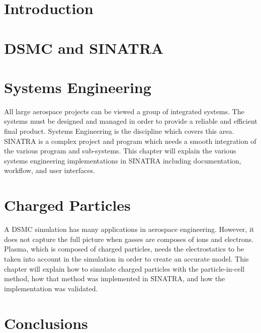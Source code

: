 \chapter{Introduction}
\label{chap:intro}


\chapter{DSMC and SINATRA}
\label{chap:dsmc}



\chapter{Systems Engineering}
\label{chap:systems}
All large aerospace projects can be viewed a group of integrated systems. The systems must be designed and managed in order to provide a reliable and efficient final product. Systems Engineering is the discipline which covers this area. SINATRA is a complex project and program which needs a smooth integration of the various program and sub-systems. This chapter will explain the various systems engineering implementations in SINATRA including documentation, workflow, and user interfaces. 




\chapter{Charged Particles}
A DSMC simulation has many applications in aerospace engineering. However, it does not capture the full picture when gasses are composes of ions and electrons. Plasma, which is composed of charged particles, needs the electrostatics to be taken into account in the simulation in order to create an accurate model. This chapter will explain how to simulate charged particles with the particle-in-cell method, how that method was implemented in SINATRA, and how the implementation was validated.
\label{chap:charge}




\chapter{Conclusions}
\label{chap:conclusions}

